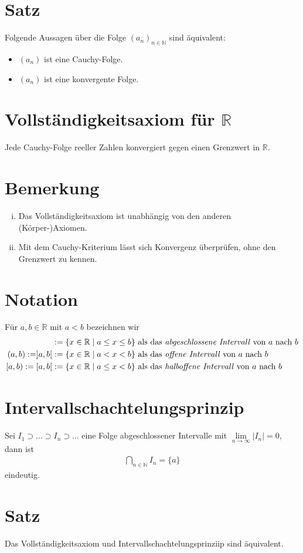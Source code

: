 \documentclass{scrreprt}
\newcommand{\NN}{\mathbb{N}}
\newcommand{\RR}{\mathbb{R}}
\begin{document}
    \section{Satz}
    Folgende Aussagen über die Folge $(a_n)_{n \in \NN}$ sind äquivalent:
    \begin{itemize}
        \item
            $(a_n)$ ist eine Cauchy-Folge.
        \item
            $(a_n)$ ist eine konvergente Folge.
    \end{itemize}

    \section{Vollständigkeitsaxiom für $\RR$}
    Jede Cauchy-Folge reeller Zahlen konvergiert gegen einen Grenzwert in $\RR$.

    \section{Bemerkung}
    \begin{enumerate}[i)]
        \item
            Das Vollständigkeitsaxiom ist unabhängig von den anderen (Körper-)Axiomen.
        \item
            Mit dem Cauchy-Kriterium lässt sich Konvergenz überprüfen, ohne den Grenzwert zu kennen.
    \end{enumerate}

    \section{Notation}
    Für $a,b \in \RR$ mit $a < b$ bezeichnen wir
    \begin{align*}
        [a,b] &:= \lbrace x \in \RR \mid a \leq x \leq b \rbrace \text{ als das \emph{abgeschlossene Intervall} von $a$ nach $b$}\\
        (a,b) := ]a,b[ &:= \lbrace x \in \RR \mid a < x < b \rbrace \text{ als das \emph{offene Intervall} von $a$ nach $b$}\\
        [a,b) := [a,b[ &:= \lbrace x \in \RR \mid a \leq x < b \rbrace \text{ als das \emph{halboffene Intervall} von $a$ nach $b$}
    \end{align*}

    \newcommand{\sebsut}{\supset}
    \newcommand{\sebsuteq}{\supseteq}

    \section{Intervallschachtelungsprinzip}
    Sei $I_1 \sebsut \dots \sebsut I_n \sebsut \dots$ eine Folge abgeschlossener Intervalle mit $\lim\limits_{n \to \infty} |I_n| = 0$, dann ist
    \begin{align*}
        \bigcap_{n \in \NN} I_n = \lbrace a \rbrace
    \end{align*}
    eindeutig.

    \section{Satz}
    Das Vollständigkeitsaxiom und Intervallschachtelungsprinziip sind äquivalent.
\end{document}

